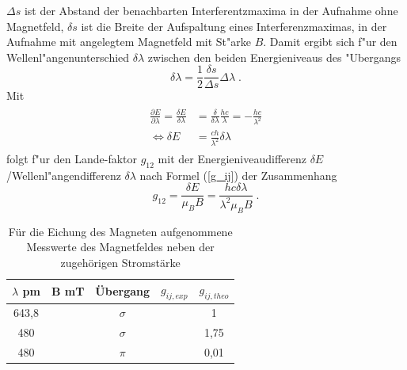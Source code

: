  $\Delta s$ ist der Abstand der benachbarten Interferentzmaxima in der Aufnahme ohne Magnetfeld, $\delta s$ ist die Breite der Aufspaltung eines Interferenzmaximas, in der Aufnahme mit angelegtem Magnetfeld mit St"arke $B$.
  Damit ergibt sich f"ur den Wellenl"angenunterschied $\delta \lambda$ zwischen den beiden Energieniveaus des "Ubergangs
  \begin{equation}
    \delta \lambda = \frac{1}{2}\frac{\delta s}{\Delta s} \Delta \lambda \; .
  \end{equation}
  Mit
  \begin{align}
    \begin{split}
    \frac{\partial E}{\partial \lambda} = \frac{\delta E}{\delta \lambda} &= \frac{\delta}{\delta \lambda} \frac{hc}{\lambda} = -\frac{hc}{\lambda^2}\\
    \iff \delta E &= \frac{ch}{\lambda^2} \delta \lambda
   \end{split}
  \end{align}
  folgt f"ur den Lande-faktor $g_{12}$ mit der Energieniveaudifferenz $\delta E$/Wellenl"angendifferenz $\delta \lambda$ nach Formel (\ref{g_ij}) der Zusammenhang
  \begin{equation}
    g_{12}=\frac{\delta E}{\mu_BB}=\frac{hc\delta \lambda}{\lambda^2\mu_BB} \; .
  \end{equation}

          \begin{table}[H] 
	\centering
	\caption{Für die Eichung des Magneten aufgenommene Messwerte des Magnetfeldes neben der zugehörigen Stromstärke} 
	\begin{tabular}{c|c|c|c|c}

  $\lambda$ pm & B mT & Übergang & $g_{ij,exp}$& $g_{ij,theo}$\\
  \hline 
643,8 &&$\sigma$&&1\\
480 &&$\sigma$&&1,75\\
480 &&$\pi$&&0,01\\


		
	\end{tabular} 
	  \label{tab:mit}
\end{table} 



















